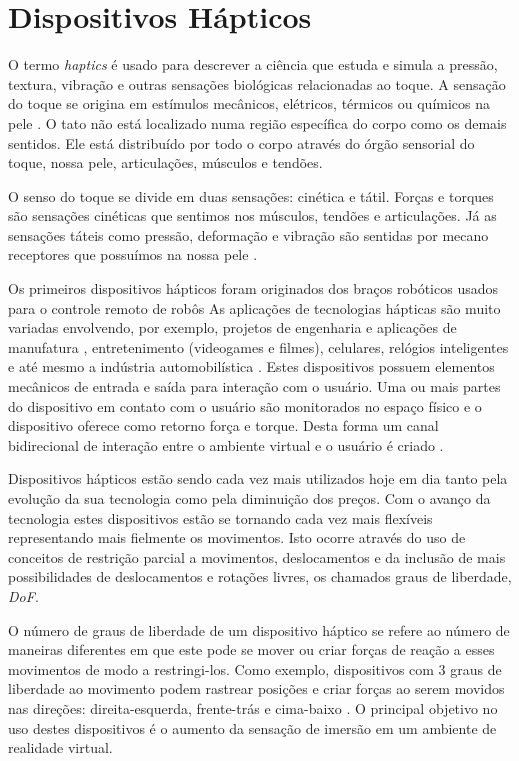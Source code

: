 \section{Dispositivos Hápticos}

O termo \textit{haptics} é usado para descrever a ciência que estuda e simula a pressão, textura, vibração e outras sensações biológicas relacionadas ao toque. A sensação do toque se origina em estímulos mecânicos, elétricos, térmicos ou químicos na pele \cite{Burdea1996}. O tato não está localizado numa região específica do corpo como os demais sentidos. Ele está distribuído por todo o corpo através do órgão sensorial do toque, nossa pele, articulações, músculos e tendões. 

O senso do toque se divide em duas sensações: cinética e tátil. Forças e torques são sensações cinéticas que sentimos nos músculos, tendões e articulações. Já as sensações táteis como pressão, deformação e vibração são sentidas por mecano receptores que possuímos na nossa pele \cite{Culbertson2018}. 

Os primeiros dispositivos hápticos foram originados dos braços robóticos usados para o controle remoto de robôs \cite{Zurawski2005} As aplicações de tecnologias hápticas são muito variadas envolvendo, por exemplo, projetos de engenharia e aplicações de manufatura \cite{Sharma2001}, entretenimento (videogames e filmes), celulares, relógios inteligentes e até mesmo a indústria automobilística \cite{Smith2019}. Estes dispositivos possuem elementos mecânicos de entrada e saída para interação com o usuário. Uma ou mais partes do dispositivo em contato com o usuário são monitorados no espaço físico e o dispositivo oferece como retorno força e torque. Desta forma um canal bidirecional de interação entre o ambiente virtual e o usuário é criado \cite{Coles2011}. 

Dispositivos hápticos estão sendo cada vez mais utilizados hoje em dia tanto pela evolução da sua tecnologia como pela diminuição dos preços. Com o avanço da tecnologia estes dispositivos estão se tornando cada vez mais flexíveis representando mais fielmente os movimentos. Isto ocorre  através do uso de conceitos de restrição parcial a movimentos, deslocamentos e da inclusão de mais possibilidades de deslocamentos e rotações livres, os chamados graus de liberdade, \textit{\acrfull{DoF}}. 

O número de graus de liberdade de um dispositivo háptico se refere ao número de maneiras diferentes em que este pode se mover ou criar forças de reação a esses movimentos de modo a restringi-los. Como exemplo, dispositivos com 3 graus de liberdade ao movimento podem rastrear posições e criar forças ao serem movidos nas direções: direita-esquerda, frente-trás e cima-baixo \cite{HAPTICSHOUSE2019}. O principal objetivo no uso destes dispositivos é o aumento da sensação de imersão em um ambiente de realidade virtual. 


